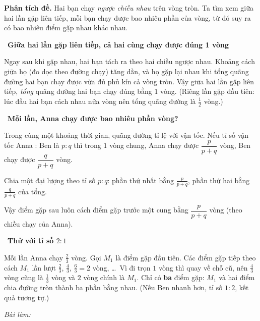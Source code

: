 \documentclass[11pt]{article}
\newif\ifsol \solfalse
\newcommand{\StuProb}[2]{\begin{probboxS}{#1}{#2}\StuProbBody\end{probboxS}}
\newcommand{\probsol}[1]{%
  \begin{lrbox}{\solmeasure}\begin{minipage}{\dimexpr\linewidth-24pt\relax}#1\end{minipage}\end{lrbox}%
  \ifsol
    \begin{solbox}#1\end{solbox}%
  \else
    \setlength{\solht}{\dimexpr\ht\solmeasure+\dp\solmeasure+0.85cm\relax}%
    \ifdim\solht<1.35cm\setlength{\solht}{1.35cm}\fi
    \ifdim\solht>\StudentMaxWork\setlength{\solht}{\StudentMaxWork}\fi
    \par\noindent\begin{minipage}{\linewidth}%
    \expandafter\StuProb\StuProbArgs
    \begin{tcolorbox}[colback=white,colframe=Line,boxrule=0.8pt,arc=5pt,
      left=8pt,right=8pt,top=4pt,bottom=4pt,height=\solht]{\footnotesize\color{Slate}\itshape\WorkWord}\end{tcolorbox}%
    \end{minipage}\par\medskip
  \fi}
\newlength{\StudentMaxWork}\setlength{\StudentMaxWork}{4.5cm}
\newcommand{\step}[2]{\par\smallskip\noindent{\bfseries\color{tmBlue!85!black}\StepWord~#1.}\ {\bfseries #2}\par\nopagebreak}
\def\WorkWord{Bài làm:}
\def\StepWord{Bước}
\begin{document}
\probsol{
\textbf{Phân tích đề.} Hai bạn chạy \emph{ngược chiều nhau} trên vòng tròn. Ta tìm xem giữa hai lần gặp liên tiếp, mỗi bạn chạy được bao nhiêu phần của vòng, từ đó suy ra có bao nhiêu điểm gặp nhau khác nhau.

\step{1}{Giữa hai lần gặp liên tiếp, cả hai cùng chạy được đúng 1 vòng}
\begin{proofbox}Ngay sau khi gặp nhau, hai bạn tách ra theo hai chiều ngược nhau. Khoảng cách giữa họ (đo dọc theo đường chạy) tăng dần, và họ gặp lại nhau khi tổng quãng đường hai bạn chạy được vừa đủ phủ kín cả vòng tròn. Vậy giữa hai lần gặp liên tiếp, \emph{tổng} quãng đường hai bạn chạy đúng bằng $1$ vòng. (Riêng lần gặp đầu tiên: lúc đầu hai bạn cách nhau nửa vòng nên tổng quãng đường là $\frac12$ vòng.)\end{proofbox}

\step{2}{Mỗi lần, Anna chạy được bao nhiêu phần vòng?}
Trong cùng một khoảng thời gian, quãng đường tỉ lệ với vận tốc. Nếu tỉ số vận tốc Anna : Ben là $p:q$ thì trong $1$ vòng chung, Anna chạy được $\dfrac{p}{p+q}$ vòng, Ben chạy được $\dfrac{q}{p+q}$ vòng.
\begin{recallbox}Chia một đại lượng theo tỉ số $p:q$: phần thứ nhất bằng $\frac{p}{p+q}$, phần thứ hai bằng $\frac{q}{p+q}$ của tổng.\end{recallbox}
Vậy điểm gặp sau luôn cách điểm gặp trước một cung bằng $\dfrac{p}{p+q}$ vòng (theo chiều chạy của Anna).

\step{3}{Thử với tỉ số $2:1$}
Mỗi lần Anna chạy $\frac{2}{3}$ vòng. Gọi $M_1$ là điểm gặp đầu tiên. Các điểm gặp tiếp theo cách $M_1$ lần lượt $\frac23$, $\frac43$, $\frac63=2$ vòng, \dots\ Vì đi trọn $1$ vòng thì quay về chỗ cũ, nên $\frac43$ vòng cũng là $\frac13$ vòng và $2$ vòng chính là $M_1$. Chỉ có \textbf{ba} điểm gặp: $M_1$ và hai điểm chia đường tròn thành ba phần bằng nhau. (Nếu Ben nhanh hơn, tỉ số $1:2$, kết quả tương tự.)

}
\end{document}
